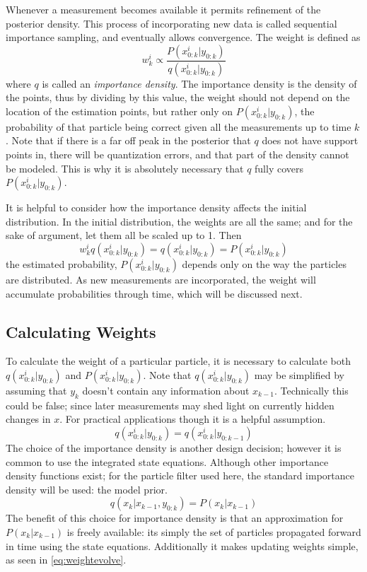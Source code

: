 Whenever a measurement becomes available it permits refinement of the
posterior density.
This process of incorporating new data is called sequential importance sampling,
and eventually allows convergence. The weight is defined as
\begin{equation}
w^i_k \propto \frac{P(x^i_{0:k} | y_{0:k})}{q(x^i_{0:k} | y_{0:k})}
\label{eq:weightfunc}
\end{equation}
where $q$ is called an \emph{importance density}. The importance density
is the density of the points, thus by dividing by this value, the weight
should not depend on the location of the estimation points, but rather
only on $P(x^i_{0:k} | y_{0:k})$, the probability of that particle
being correct given all the measurements up to time $k$. 
Note that if there is a far off peak in
the posterior that $q$ does not have support points in, there will 
be quantization errors, and that part of the density cannot be modeled. This is why
it is absolutely necessary that $q$ fully covers $P(x^i_{0:k} | y_{0:k})$.

It is helpful
to consider how the importance density affects the initial distribution. 
In the initial distribution, the weights are all the same; and for
the sake of argument, let them all be scaled up to 1. Then
\begin{equation}
w^i_k q(x^i_{0:k} | y_{0:k}) = q(x^i_{0:k} | y_{0:k}) = P(x^i_{0:k} | y_{0:k})
\end{equation}
the estimated probability, $P(x^i_{0:k} | y_{0:k})$ depends only on the 
way the particles are distributed. As new measurements are incorporated,
the weight will accumulate probabilities through time, which will be discussed
next. 

\subsection{Calculating Weights}
To calculate the weight of a particular particle, it is necessary to 
calculate both $q(x^i_{0:k} | y_{0:k})$ and $P(x^i_{0:k} | y_{0:k})$.
Note that $q(x^i_{0:k} | y_{0:k})$ may be simplified by assuming that 
$y_k$ doesn't contain any information about $x_{k-1}$. Technically this 
could be false; since later measurements may shed light on currently hidden
changes in $x$. For practical applications though it is a helpful assumption.
\begin{equation}
q(x^i_{0:k} | y_{0:k}) = q(x^i_{0:k} | y_{0:k-1})
\label{eq:QAssump}
\end{equation}
The choice of the importance density is another design decision; however
it is common to use the integrated state equations. 
Although other importance density functions exist; for the particle filter
used here, the standard importance density will be used: the model
prior.
\begin{equation}
q(x_k | x_{k-1}, y_{0:k}) =  P(x_k | x_{k-1})
\label{eq:ImportanceDensity}
\end{equation}
The benefit of this choice for importance density is that an approximation for
$P(x_k | x_{k-1})$ is freely available: its simply the set of particles propagated
forward in time using the state equations. Additionally it makes
updating weights simple, as seen in \autoref{eq:weightevolve}.

